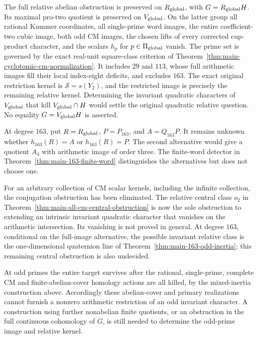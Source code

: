 \documentclass[11pt,a4paper]{article}
\theoremstyle{definition}
\theoremstyle{remark}
\begin{document}
The full relative abelian obstruction is preserved on \(R_{\rm global}\),
with \(G=R_{\rm global}H\). Its maximal pro-two quotient is preserved
on \(V_{\rm global}\). On the latter group all rational Kummer
coordinates, all single-prime word images, the entire coefficient-two
cubic image, both odd CM images, the chosen lifts of every corrected
cup-product character, and the scalars \(h_p\) for
\(p\in\Pi_{\rm global}\) vanish.
The prime set is governed by the exact real-unit square-class criterion
of Theorem~\ref{thm:main-cyclotomic-cm-normalization}. It includes
\(29\) and \(113\), whose full arithmetic images fill their local
index-eight deficits, and excludes \(163\).
The exact original restriction kernel is \(\mathcal S=s(Y_2)\),
and the restricted image is precisely the remaining relative kernel.
Determining the invariant quadratic characters of \(V_{\rm global}\)
that kill \(V_{\rm global}\cap H\) would settle the original quadratic
relative question. No equality \(G=V_{\rm global}H\) is asserted.

At degree \(163\), put \(R=R_{\rm global}\), \(P=P_{163}\), and
\(A=Q_{163}P\). It remains unknown whether \(h_{163}(R)=A\) or
\(h_{163}(R)=P\). The second alternative would give a quotient
\(A_4\) with arithmetic image of order three. The finite-word detector
in Theorem~\ref{thm:main-163-finite-word} distinguishes the alternatives
but does not choose one.

For an arbitrary collection of CM scalar kernels, including the
infinite collection, the conjugation obstruction has been eliminated.
The relative central class \(o_2\) in
Theorem~\ref{thm:main-all-cm-central-obstruction} is now the sole
obstruction to extending an intrinsic invariant quadratic character
that vanishes on the arithmetic intersection. Its vanishing is not
proved in general. At degree \(163\), conditional on the full-image
alternative, the possible invariant relative class is the
one-dimensional quaternion line of
Theorem~\ref{thm:main-163-odd-inertia}; this remaining central
obstruction is also undecided.

At odd primes the entire target survives after the rational,
single-prime, complete CM and finite-abelian-cover homology actions
are all killed, by the mixed-inertia construction above. Accordingly
these abelian-cover and primary realizations cannot furnish a
nonzero arithmetic restriction of an odd invariant character.
A construction using further nonabelian finite quotients, or an
obstruction in the full continuous cohomology of \(G\), is still
needed to determine the odd-prime image and relative kernel.
\end{document}
